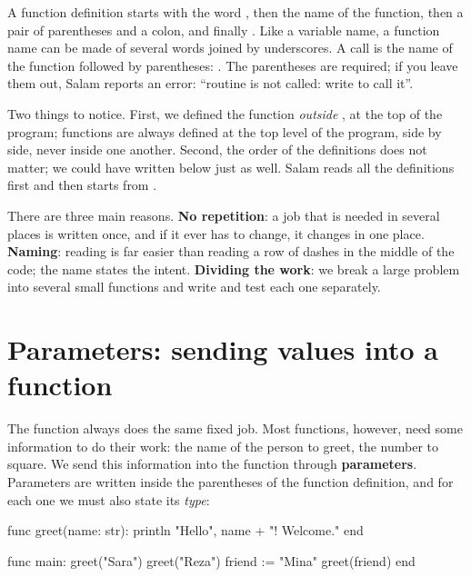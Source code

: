 A function definition starts with the word , then the name of the
function, then a pair of parentheses and a colon, and finally .
Like a variable name, a function name can be made of several words joined by underscores. A call
is the name of the function followed by parentheses:
. The parentheses are required; if you leave them
out, Salam reports an error: ``routine  is not
called: write  to call it''.

Two things to notice. First, we defined the function \emph{outside}
, at the top of the program; functions are always defined at the
top level of the program, side by side, never inside one another. Second,
the order of the definitions does not matter; we could have written
 below  just as well. Salam reads all the
definitions first and then starts from .

\begin{note}
There are three main reasons. \textbf{No repetition}: a job that is needed
in several places is written once, and if it ever has to change, it changes
in one place. \textbf{Naming}: reading  is far
easier than reading a row of dashes in the middle of the code; the name
states the intent. \textbf{Dividing the work}: we break a large problem
into several small functions and write and test each one separately.
\end{note}

\section{Parameters: sending values into a function}

The function  always does the same fixed job. Most
functions, however, need some information to do their work: the name of the
person to greet, the number to square. We send this information into the
function through \textbf{parameters}. Parameters are written inside the
parentheses of the function definition, and for each one we must also state
its \emph{type}:

\begin{salamcode}
func greet(name: str):
    println "Hello", name + "! Welcome."
end

func main:
    greet("Sara")
    greet("Reza")
    friend := "Mina"
    greet(friend)
end
\end{salamcode}

